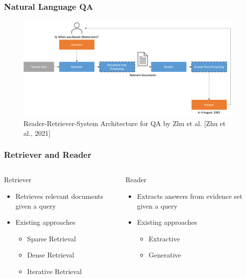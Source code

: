 \documentclass{beamer}
\begin{document}
\begin{frame}
  \frametitle{Natural Language QA}

  \begin{figure}
    \includegraphics[width=\textwidth]{Grafiken/Retriever_Reader.png}
    \caption{Reader-Retriever-System Architecture for QA by Zhu et al. [Zhu et al., 2021]}
  \end{figure}

\end{frame}

\begin{frame}
  \frametitle{Retriever and Reader}

  \begin{columns}[t]
    \begin{column}{.5\textwidth}
    {\color{unirot}Retriever}
    \begin{itemize}
      \item Retrieves relevant documents given a query
      \item Existing approaches
      \begin{itemize}
        \item Sparse Retrieval
        \item Dense Retrieval
        \item Iterative Retrieval
      \end{itemize}
    \end{itemize}
    \end{column}
    \begin{column}{.5\textwidth}
    {\color{unirot}Reader}
    \begin{itemize}
      \item Extracts answers from evidence set given a query
      \item Existing approaches
      \begin{itemize}
        \item Extractive
        \item Generative
      \end{itemize}
    \end{itemize}
    \end{column}
  \end{columns}

\end{frame}
\end{document}
